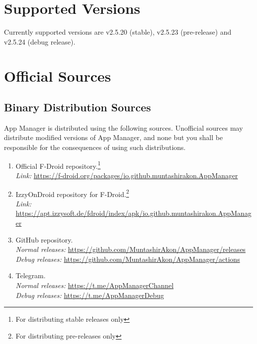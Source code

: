 \section{Supported Versions}\label{sec:supported-versions} %
Currently supported versions are v2.5.20 (stable), v2.5.23 (pre-release) and v2.5.24 (debug release).

\section{Official Sources}\label{sec:official-sources} %

\subsection{Binary Distribution Sources}\label{subsec:binary-distribution-sources} %
App Manager is distributed using the following sources. Unofficial sources may distribute modified versions of App
Manager, and none but you shall be responsible for the consequences of using such distributions.
\begin{enumerate}
    \item Official F-Droid repository.\footnote{For distributing stable releases only}\\
    \textit{Link:} \url{https://f-droid.org/packages/io.github.muntashirakon.AppManager}
    \item IzzyOnDroid repository for F-Droid.\footnote{For distributing pre-releases only}\\
    \textit{Link:} \url{https://apt.izzysoft.de/fdroid/index/apk/io.github.muntashirakon.AppManager}
    \item GitHub repository.\\
    \textit{Normal releases:} \url{https://github.com/MuntashirAkon/AppManager/releases}\\
    \textit{Debug releases:} \url{https://github.com/MuntashirAkon/AppManager/actions}
    \item Telegram.\\
    \textit{Normal releases:} \url{https://t.me/AppManagerChannel}\\
    \textit{Debug releases:} \url{https://t.me/AppManagerDebug}
\end{enumerate}

